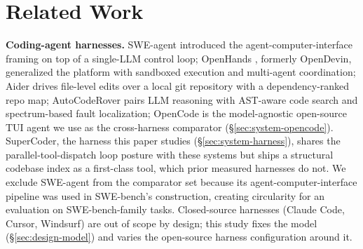 %
%

\section{Related Work}
\label{sec:related}

\textbf{Coding-agent harnesses.} SWE-agent \citep{sweagent2024} introduced the
agent-computer-interface framing on top of a single-LLM control loop; OpenHands
\citep{openhands2025}, formerly OpenDevin, generalized the platform with sandboxed
execution and multi-agent coordination; Aider \citep{aider} drives file-level edits over a
local git repository with a dependency-ranked repo map; AutoCodeRover
\citep{autocoderover2024} pairs LLM reasoning with AST-aware code search and
spectrum-based fault localization; OpenCode \citep{opencode2025} is the model-agnostic
open-source TUI agent we use as the cross-harness comparator
(\S\ref{sec:system-opencode}). SuperCoder, the harness this paper studies
(\S\ref{sec:system-harness}), shares the parallel-tool-dispatch loop posture with these
systems but ships a structural codebase index as a first-class tool, which prior
measured harnesses do not. We exclude SWE-agent from the comparator set because its
agent-computer-interface pipeline was used in SWE-bench's construction, creating
circularity for an evaluation on SWE-bench-family tasks. Closed-source harnesses (Claude
Code, Cursor, Windsurf) are out of scope by design; this study fixes the model
(\S\ref{sec:design-model}) and varies the open-source harness configuration around it.


